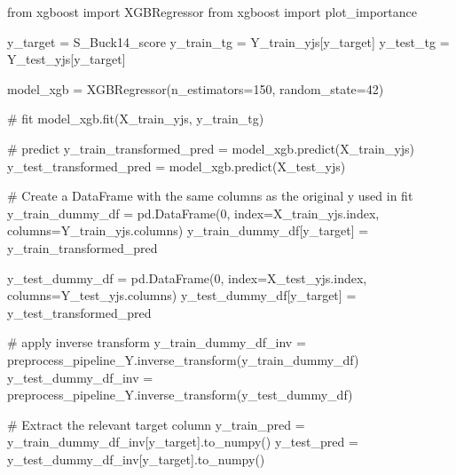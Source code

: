 \documentclass[
  letterpaper,
  DIV=11,
  numbers=noendperiod]{scrartcl}
\newenvironment{Shaded}{\begin{snugshade}}{\end{snugshade}}
\newcommand{\CommentTok}[1]{\textcolor[rgb]{0.37,0.37,0.37}{#1}}
\newcommand{\DecValTok}[1]{\textcolor[rgb]{0.68,0.00,0.00}{#1}}
\newcommand{\ImportTok}[1]{\textcolor[rgb]{0.00,0.46,0.62}{#1}}
\newcommand{\NormalTok}[1]{\textcolor[rgb]{0.00,0.23,0.31}{#1}}
\newcommand{\OperatorTok}[1]{\textcolor[rgb]{0.37,0.37,0.37}{#1}}
\newcommand{\StringTok}[1]{\textcolor[rgb]{0.13,0.47,0.30}{#1}}
\begin{document}
\begin{Shaded}
\begin{Highlighting}[]
\ImportTok{from}\NormalTok{ xgboost }\ImportTok{import}\NormalTok{ XGBRegressor}
\ImportTok{from}\NormalTok{ xgboost }\ImportTok{import}\NormalTok{ plot\_importance}

\NormalTok{y\_target }\OperatorTok{=} \StringTok{\textquotesingle{}S\_Buck14\_score\textquotesingle{}}
\NormalTok{y\_train\_tg }\OperatorTok{=}\NormalTok{ Y\_train\_yjs[y\_target]}
\NormalTok{y\_test\_tg }\OperatorTok{=}\NormalTok{ Y\_test\_yjs[y\_target]}

\NormalTok{model\_xgb }\OperatorTok{=}\NormalTok{ XGBRegressor(n\_estimators}\OperatorTok{=}\DecValTok{150}\NormalTok{, random\_state}\OperatorTok{=}\DecValTok{42}\NormalTok{)}

\CommentTok{\# fit}
\NormalTok{model\_xgb.fit(X\_train\_yjs, y\_train\_tg)}

\CommentTok{\# predict}
\NormalTok{y\_train\_transformed\_pred }\OperatorTok{=}\NormalTok{ model\_xgb.predict(X\_train\_yjs)}
\NormalTok{y\_test\_transformed\_pred }\OperatorTok{=}\NormalTok{ model\_xgb.predict(X\_test\_yjs)}

\CommentTok{\# Create a DataFrame with the same columns as the original y used in fit}
\NormalTok{y\_train\_dummy\_df }\OperatorTok{=}\NormalTok{ pd.DataFrame(}\DecValTok{0}\NormalTok{, index}\OperatorTok{=}\NormalTok{X\_train\_yjs.index, columns}\OperatorTok{=}\NormalTok{Y\_train\_yjs.columns)}
\NormalTok{y\_train\_dummy\_df[y\_target] }\OperatorTok{=}\NormalTok{ y\_train\_transformed\_pred}

\NormalTok{y\_test\_dummy\_df }\OperatorTok{=}\NormalTok{ pd.DataFrame(}\DecValTok{0}\NormalTok{, index}\OperatorTok{=}\NormalTok{X\_test\_yjs.index, columns}\OperatorTok{=}\NormalTok{Y\_test\_yjs.columns)}
\NormalTok{y\_test\_dummy\_df[y\_target] }\OperatorTok{=}\NormalTok{ y\_test\_transformed\_pred}

\CommentTok{\# apply inverse transform}
\NormalTok{y\_train\_dummy\_df\_inv }\OperatorTok{=}\NormalTok{ preprocess\_pipeline\_Y.inverse\_transform(y\_train\_dummy\_df)}
\NormalTok{y\_test\_dummy\_df\_inv }\OperatorTok{=}\NormalTok{ preprocess\_pipeline\_Y.inverse\_transform(y\_test\_dummy\_df)}

\CommentTok{\# Extract the relevant target column}
\NormalTok{y\_train\_pred }\OperatorTok{=}\NormalTok{ y\_train\_dummy\_df\_inv[y\_target].to\_numpy()}
\NormalTok{y\_test\_pred }\OperatorTok{=}\NormalTok{ y\_test\_dummy\_df\_inv[y\_target].to\_numpy()}


\end{Highlighting}
\end{Shaded}
\end{document}
